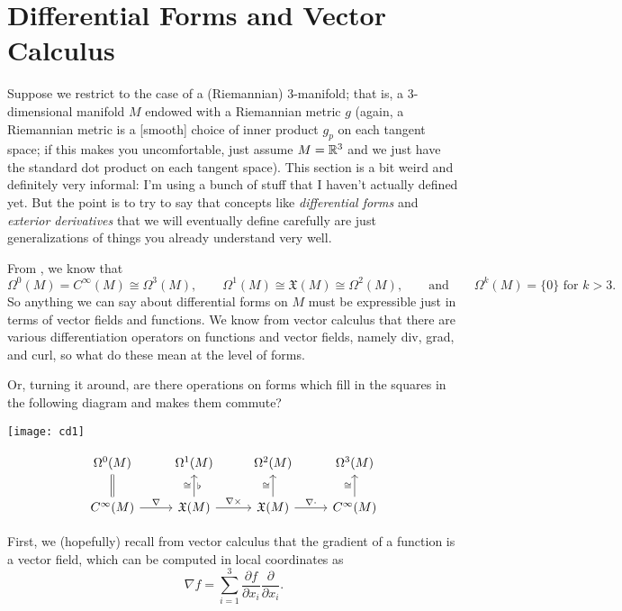 
\section{Differential Forms and Vector Calculus}
\label{sec:vector calculus}

Suppose we restrict to the case of a (Riemannian) 3-manifold; that is, a 3-dimensional manifold $M$ endowed with a Riemannian metric $g$ (again, a Riemannian metric is a [smooth] choice of inner product $g_p$ on each tangent space; if this makes you uncomfortable, just assume $M = \mathbb{R}^3$ and we just have the standard dot product on each tangent space). This section is a bit weird and definitely very informal: I'm using a bunch of stuff that I haven't actually defined yet. But the point is to try to say that concepts like \emph{differential forms} and \emph{exterior derivatives} that we will eventually define carefully are just generalizations of things you already understand very well.

From , we know that
\[
	\Omega^0(M) = C^\infty(M) \cong \Omega^3(M), \qquad \Omega^1(M) \cong \mathfrak{X}(M) \cong \Omega^2(M), \qquad \text{and} \qquad \Omega^k(M) = \{0\} \text{ for } k > 3.
\]
So anything we can say about differential forms on $M$ must be expressible just in terms of vector fields and functions. We know from vector calculus that there are various differentiation operators on functions and vector fields, namely div, grad, and curl, so what do these mean at the level of forms.

Or, turning it around, are there operations on forms which fill in the squares in the following diagram and makes them commute?

\ifplastex
	\begin{center}
		\texttt{[image: cd1]}
	\end{center}
\else	
	\[
		\begin{tikzcd}
			\Omega^0(M) & \Omega^1(M) & \Omega^2(M) & \Omega^3(M) \\
			C^\infty(M) \arrow[u, equal] \arrow[r,"\nabla"] & \mathfrak{X}(M) \arrow[u,"\cong","\flat"'] \arrow[r,"\nabla\times"] & \mathfrak{X}(M) \arrow[u,"\cong"] \arrow[r,"\nabla \cdot"] & C^\infty(M) \arrow[u,"\cong"]
		\end{tikzcd}
	\]
\fi


First, we (hopefully) recall from vector calculus that the gradient of a function is a vector field, which can be computed in local coordinates as
\[
	\nabla f = \sum_{i=1}^3 \frac{\partial f}{\partial x_i}\frac{\partial}{\partial x_i}.
\]

